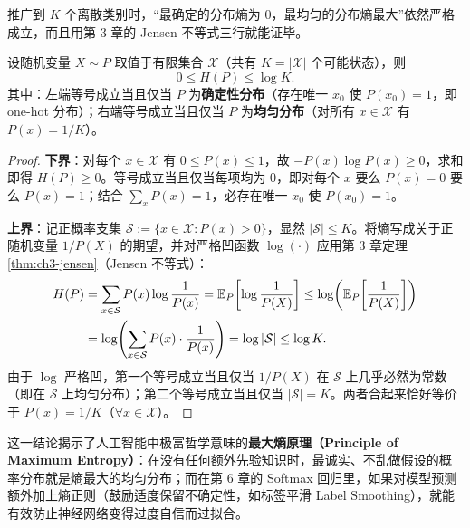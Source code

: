 推广到 $K$ 个离散类别时，“最确定的分布熵为 $0$，最均匀的分布熵最大”依然严格成立，而且用第 3 章的 Jensen 不等式三行就能证毕。

\begin{thmBox}
\begin{theorem}[离散熵的上下界与最大熵原理]
\label{thm:ch4-entropy-bounds}
设随机变量 $X \sim P$ 取值于有限集合 $\mathcal{X}$（共有 $K = |\mathcal{X}|$ 个可能状态），则
\begin{equation}
  0 \le H(P) \le \log K. \label{eq:ch4-entropy-bounds}
\end{equation}
其中：左端等号成立当且仅当 $P$ 为\textbf{确定性分布}（存在唯一 $x_0$ 使 $P(x_0)=1$，即 one-hot 分布）；右端等号成立当且仅当 $P$ 为\textbf{均匀分布}（对所有 $x \in \mathcal{X}$ 有 $P(x) = 1/K$）。
\end{theorem}
\end{thmBox}

\begin{proof}
\textbf{下界}：对每个 $x \in \mathcal{X}$ 有 $0 \le P(x) \le 1$，故 $-P(x)\log P(x) \ge 0$，求和即得 $H(P) \ge 0$。等号成立当且仅当每项均为 $0$，即对每个 $x$ 要么 $P(x)=0$ 要么 $P(x)=1$；结合 $\sum_x P(x)=1$，必存在唯一 $x_0$ 使 $P(x_0)=1$。

\textbf{上界}：记正概率支集 $\mathcal{S} := \{x \in \mathcal{X} : P(x) > 0\}$，显然 $|\mathcal{S}| \le K$。将熵写成关于正随机变量 $1/P(X)$ 的期望，并对严格凹函数 $\log(\cdot)$ 应用第 3 章定理 \ref{thm:ch3-jensen}（Jensen 不等式）：
\begin{align*}
  H(P)
  &= \sum_{x \in \mathcal{S}} P(x)\log\frac{1}{P(x)}
   = \mathbb{E}_{P}\!\left[\log\frac{1}{P(X)}\right]
   \le \log\!\left(\mathbb{E}_P\!\left[\frac{1}{P(X)}\right]\right) \\
  &= \log\!\left(\sum_{x \in \mathcal{S}} P(x)\cdot \frac{1}{P(x)}\right)
   = \log |\mathcal{S}|
   \le \log K.
\end{align*}
由于 $\log$ 严格凹，第一个等号成立当且仅当 $1/P(X)$ 在 $\mathcal{S}$ 上几乎必然为常数（即在 $\mathcal{S}$ 上均匀分布）；第二个等号成立当且仅当 $|\mathcal{S}| = K$。两者合起来恰好等价于 $P(x) = 1/K$（$\forall x \in \mathcal{X}$）。
\end{proof}

这一结论揭示了人工智能中极富哲学意味的\textbf{最大熵原理（Principle of Maximum Entropy）}：在没有任何额外先验知识时，最诚实、不乱做假设的概率分布就是熵最大的均匀分布；而在第 6 章的 Softmax 回归里，如果对模型预测额外加上熵正则（鼓励适度保留不确定性，如标签平滑 Label Smoothing），就能有效防止神经网络变得过度自信而过拟合。

